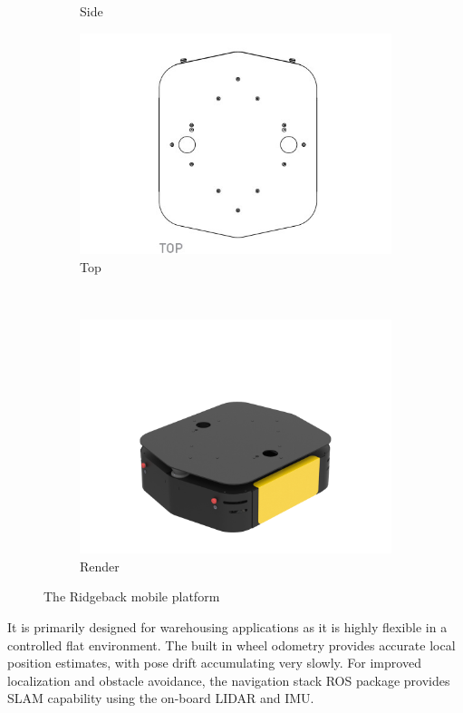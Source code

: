 \documentclass[times, utf8, diplomski, english]{fer}
\begin{document}
\begin{figure}[h]
\begin{subfigure}[t]{0.34\textwidth}
        \caption{Side}
    \end{subfigure}
    \begin{subfigure}[t]{0.34\textwidth}
        \includegraphics[width=\textwidth]{rb_top}
        \caption{Top}
    \end{subfigure}
     ~%
    \begin{subfigure}[t]{0.34\textwidth}
        \includegraphics[width=\textwidth]{ridgeback}
        \caption{Render}
    \end{subfigure}
    \caption{The Ridgeback mobile platform}\label{fig:ridgeback}
\end{figure}
It is primarily designed for warehousing applications as it is highly flexible in a controlled flat environment.
The built in wheel odometry provides accurate local position estimates, with pose drift accumulating very slowly.
For improved localization and obstacle avoidance, the navigation stack ROS package provides SLAM capability using the on-board LIDAR and IMU.
\end{document}
